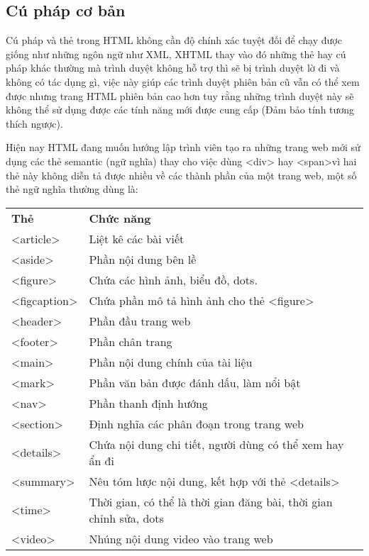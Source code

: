 \subsection{Cú pháp cơ bản}
Cú pháp và thẻ trong HTML không cần độ chính xác tuyệt đối để chạy được
giống như những ngôn ngữ như XML, XHTML thay vào đó những thẻ hay cú pháp khác thường mà trình duyệt không hỗ trợ thì sẽ bị trình duyệt lờ đi và không có tác dụng gì, việc này giúp các trình duyệt phiên bản cũ vẫn có thể xem được nhưng trang HTML phiên bản cao hơn tuy rằng những trình duyệt này sẽ không thể sử dụng được các tính năng mới được cung cấp (Đảm bảo tính tương thích ngược).\par
Hiện nay HTML đang muốn hướng lập trình viên tạo ra những trang web mới sử dụng các thẻ semantic (ngữ nghĩa) thay cho việc dùng <div> hay <span>vì hai thẻ này không diễn tả được nhiều về các thành phần của một trang web, một số thẻ ngữ nghĩa thường dùng là:
\begin{center}
	\begin{tabular}{|l|l|}
		\cline{1-2}
		\textbf{Thẻ} & \textbf{Chức năng}                                                \\ \cline{1-2}
		<article>    & Liệt kê các bài viết                                              \\ \cline{1-2}
		<aside>      & Phần nội dung bên lề                                              \\ \cline{1-2}
		<figure>     & Chứa các hình ảnh, biểu đồ, dots.                                  \\ \cline{1-2}
		<figcaption> & Chứa phần mô tả hình ảnh cho thẻ <figure>                         \\ \cline{1-2}
		<header>     & Phần đầu trang web                                                \\ \cline{1-2}
		<footer>     & Phần chân trang                                                   \\ \cline{1-2}
		<main>       & Phần nội dung chính của tài liệu                                  \\ \cline{1-2}
		<mark>       & Phần văn bản được đánh dấu, làm nổi bật                           \\ \cline{1-2}
		<nav>        & Phần thanh định hướng                                             \\ \cline{1-2}
		<section>    & Định nghĩa các phân đoạn trong trang web                          \\ \cline{1-2}
		<details>    & Chứa nội dung chi tiết, người dùng có thể xem hay ẩn đi           \\ \cline{1-2}
		<summary>    & Nêu tóm lược nội dung, kết hợp với thẻ <details>                  \\ \cline{1-2}
		<time>       & Thời gian, có thể là thời gian đăng bài, thời gian chỉnh sửa, dots \\ \cline{1-2}
		<video>      & Nhúng nội dung video vào trang web                                \\ \cline{1-2}
	\end{tabular}
\end{center}

